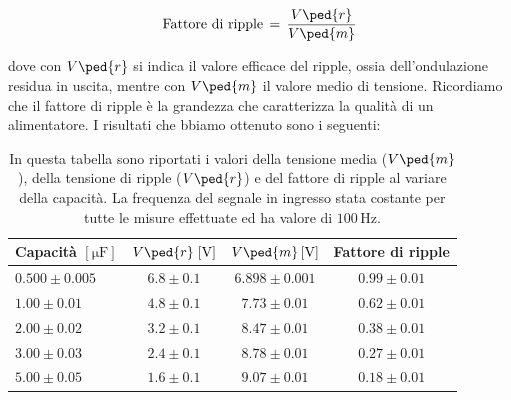\begin{equation}
	\text{Fattore di ripple} \,=\, \frac{V\ped{r}}{V\ped{m}}
\end{equation}

dove con $V\ped{r}$ si indica il valore efficace del ripple, ossia dell’ondulazione residua in uscita, mentre con $V\ped{m}$ il valore medio di tensione.
Ricordiamo che il fattore di ripple è la grandezza che caratterizza la qualità di un alimentatore.
I risultati che bbiamo ottenuto sono i seguenti:

\begin{table}[H]
    \centering
    \small
    \begin{tabular}{l c c c}
        \toprule
		Capacità $[\si{\micro\farad}]$ & $V\ped{r} \; [\si{\volt}]$ & $V\ped{m} \, [\si{\volt}]$ & Fattore di ripple \\
        \midrule
		$ 0.500 \pm 0.005 $ & $6.8 \pm 0.1 $ & $ 6.898 \pm 0.001 $ & $ 0.99 \pm 0.01 $ \\
		$ 1.00 \pm 0.01 $ & $ 4.8 \pm 0.1$ & $ 7.73 \pm 0.01 $ & $ 0.62 \pm 0.01$ \\
		$ 2.00 \pm 0.02 $ & $ 3.2 \pm 0.1$ & $ 8.47 \pm 0.01 $ & $ 0.38 \pm 0.01$ \\
		$ 3.00 \pm 0.03 $ & $ 2.4 \pm 0.1$ & $ 8.78 \pm 0.01 $ & $ 0.27 \pm 0.01$ \\
		$ 5.00 \pm 0.05 $ & $ 1.6 \pm 0.1$ & $ 9.07 \pm 0.01 $ & $ 0.18 \pm 0.01$ \\
        \bottomrule
    \end{tabular}
    \caption{In questa tabella sono riportati i valori della tensione media ($V\ped{m}$), della tensione di ripple ($V\ped{r}$) e del fattore di ripple al variare della capacità. La frequenza del segnale in ingresso stata costante per tutte le misure effettuate ed ha valore di $100\,\si{\hertz}$. }
    \label{tab:ripple}
\end{table}








